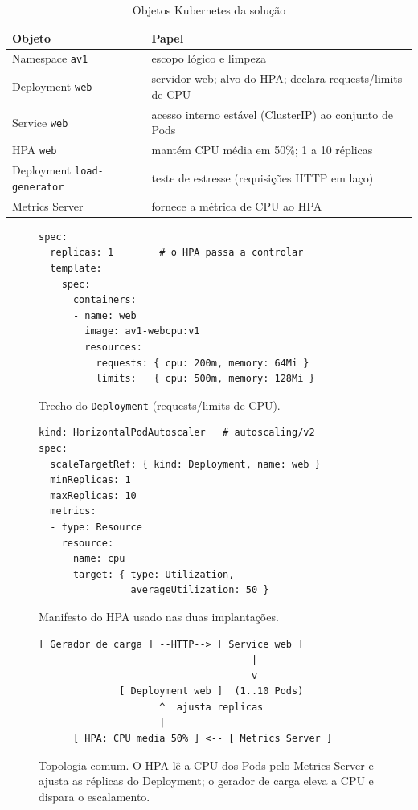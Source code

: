 \documentclass[conference]{IEEEtran}
\begin{document}
\begin{table}[!t]
\caption{Objetos Kubernetes da solução}
\label{tab:comp-obj}
\centering
\footnotesize
\begin{tabular}{@{}p{1.6cm}p{5.6cm}@{}}
\toprule
\textbf{Objeto} & \textbf{Papel} \\
\midrule
Namespace \texttt{av1} & escopo lógico e limpeza \\
Deployment \texttt{web} & servidor web; alvo do HPA; declara requests/limits de CPU \\
Service \texttt{web} & acesso interno estável (ClusterIP) ao conjunto de Pods \\
HPA \texttt{web} & mantém CPU média em 50\%; 1 a 10 réplicas \\
Deployment \texttt{load-generator} & teste de estresse (requisições HTTP em laço) \\
Metrics Server & fornece a métrica de CPU ao HPA \\
\bottomrule
\end{tabular}
\end{table}

\begin{figure}[!t]
\footnotesize
\begin{verbatim}
spec:
  replicas: 1        # o HPA passa a controlar
  template:
    spec:
      containers:
      - name: web
        image: av1-webcpu:v1
        resources:
          requests: { cpu: 200m, memory: 64Mi }
          limits:   { cpu: 500m, memory: 128Mi }
\end{verbatim}
\caption{Trecho do \texttt{Deployment} (requests/limits de CPU).}
\label{fig:deploy}
\end{figure}

\begin{figure}[!t]
\footnotesize
\begin{verbatim}
kind: HorizontalPodAutoscaler   # autoscaling/v2
spec:
  scaleTargetRef: { kind: Deployment, name: web }
  minReplicas: 1
  maxReplicas: 10
  metrics:
  - type: Resource
    resource:
      name: cpu
      target: { type: Utilization,
                averageUtilization: 50 }
\end{verbatim}
\caption{Manifesto do HPA usado nas duas implantações.}
\label{fig:hpa}
\end{figure}

\begin{figure}[!t]
\centering
\footnotesize
\begin{verbatim}
[ Gerador de carga ] --HTTP--> [ Service web ]
                                     |
                                     v
              [ Deployment web ]  (1..10 Pods)
                     ^  ajusta replicas
                     |
      [ HPA: CPU media 50% ] <-- [ Metrics Server ]
\end{verbatim}
\caption{Topologia comum. O HPA lê a CPU dos Pods pelo Metrics Server e ajusta as réplicas do
Deployment; o gerador de carga eleva a CPU e dispara o escalamento.}
\label{fig:arq}
\end{figure}
\end{document}
